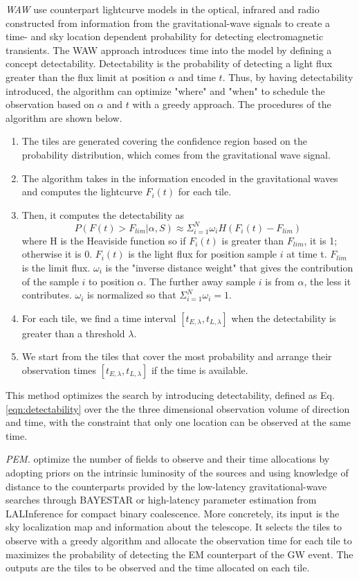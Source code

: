 \documentclass[twocolumn]{aastex61}
\begin{document}
\emph{WAW} \cite{SoCo2017} use counterpart lightcurve models in the optical, infrared and radio constructed from information from the gravitational-wave signals to create a time- and sky location dependent probability for detecting electromagnetic transients. The WAW approach introduces time into the model by defining a concept detectability. Detectability is the probability of detecting a light flux greater than the flux limit at position $\alpha$ and time $t$. Thus, by having detectability introduced, the algorithm can optimize "where" and "when" to schedule the observation based on $\alpha$ and $t$ with a greedy approach. The procedures of the algorithm are shown below.
\begin{enumerate}
\item The tiles are generated covering the confidence region based on the probability distribution, which comes from the gravitational wave signal.
\item The algorithm takes in the information encoded in the gravitational waves and computes the lightcurve $F_i(t)$ for each tile. 
\item Then, it computes the detectability as
\begin{equation}\label{eqn:detectability}
P(F(t) > F_{lim}|\alpha, S)\approx\Sigma_{i=1}^N\omega_i H(F_i(t)-F_{lim})
\end{equation}
where H is the Heaviside function so if $F_i(t)$ is greater than $F_{lim}$, it is 1; otherwise it is 0. $F_i(t)$ is the light flux for position sample $i$ at time t. $F_{lim}$ is the limit flux. $\omega_i$ is the "inverse distance weight" that gives the contribution of the sample $i$ to position $\alpha$. The further away sample $i$ is from $\alpha$, the less it contributes. $\omega_i$ is normalized so that $\Sigma_{i=1}^N\omega_i=1$. 
\item For each tile, we find a time interval $[t_{E,\lambda},t_{L,\lambda}]$ when the detectability is greater than a threshold $\lambda$.
\item We start from the tiles that cover the most probability and arrange their observation times $[t_{E,\lambda},t_{L,\lambda}]$ if the time is available.
\end{enumerate}
This method optimizes the search by introducing detectability, defined as Eq.\ref{eqn:detectability} over the the three dimensional observation volume of direction and time, with the constraint that only one location can be observed at the same time.

\emph{PEM.} \cite{ChHu2017} optimize the number of fields to observe and their time allocations by adopting priors on the intrinsic luminosity of the sources and using knowledge of distance to the counterparts provided by the low-latency gravitational-wave searches through BAYESTAR \citep{SiPr2016} or high-latency parameter estimation from LALInference \citep{VeRa2015} for compact binary coalescence. More concretely, its input is the sky localization map and information about the telescope. It selects the tiles to observe with a greedy algorithm and allocate the observation time for each tile to maximizes the probability of detecting the EM counterpart of the GW event. The outputs are the tiles to be observed and the time allocated on each tile.
\end{document}
